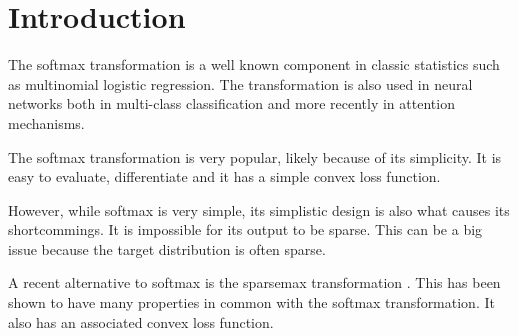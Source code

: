 \section{Introduction}

The softmax transformation is a well known component in classic statistics such as multinomial logistic regression. The transformation is also used in neural networks both in multi-class classification and more recently in attention mechanisms.

The softmax transformation is very popular, likely because of its simplicity. It is easy to evaluate, differentiate and it has a simple convex loss function.

However, while softmax is very simple, its simplistic design is also what causes its shortcommings. It is impossible for its output to be sparse. This can be a big issue because the target distribution is often sparse.

A recent alternative to softmax is the sparsemax transformation \cite{sparsemax}. This has been shown to have many properties in common with the softmax transformation. It also has an associated convex loss function.